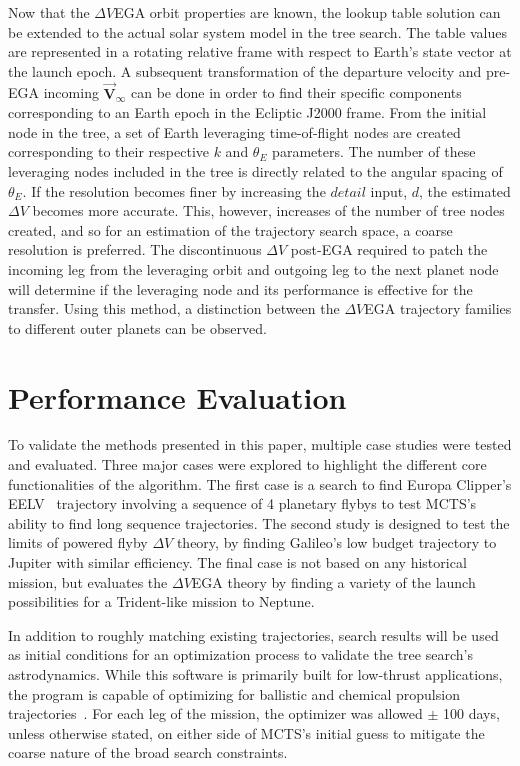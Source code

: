 \documentclass[letterpaper, preprint, paper,11pt]{AAS}	%
\begin{document}
Now that the $\Delta V$EGA orbit properties are known, the lookup table solution can be extended to the actual solar system model in the tree search. The table values are represented in a rotating relative frame with respect to Earth's state vector at the launch epoch. A subsequent transformation of the departure velocity and pre-EGA incoming $\vec{\textbf{V}}_{\infty}$ can be done in order to find their specific components corresponding to an Earth epoch in the Ecliptic J2000 frame. From the initial node in the tree, a set of Earth leveraging time-of-flight nodes are created corresponding to their respective $k$ and $\theta_E$ parameters. The number of these leveraging nodes included in the tree is directly related to the angular spacing of $\theta_E$. If the resolution becomes finer by increasing the $\textit{detail}$ input, $d$, the estimated $\Delta V$ becomes more accurate. This, however, increases of the number of tree nodes created, and so for an estimation of the trajectory search space, a coarse resolution is preferred. The discontinuous $\Delta V$ post-EGA required to patch the incoming leg from the leveraging orbit and outgoing leg to the next planet node will determine if the leveraging node and its performance is effective for the transfer. Using this method, a distinction between the $\Delta V$EGA trajectory families to different outer planets can be observed.

\section*{Performance Evaluation}

To validate the methods presented in this paper, multiple case studies were tested and evaluated. Three major cases were explored to highlight the different core functionalities of the algorithm. The first case is a search to find Europa Clipper's EELV~\cite{Buffington2014} trajectory involving a sequence of 4 planetary flybys to test MCTS's ability to find long sequence trajectories. The second study is designed to test the limits of powered flyby $\Delta V$ theory, by finding Galileo's low budget trajectory to Jupiter with similar efficiency. The final case is not based on any historical mission, but evaluates the $\Delta V$EGA theory by finding a variety of the launch possibilities for a Trident-like mission to Neptune.

In addition to roughly matching existing trajectories, search results will be used as initial conditions for an optimization process to validate the tree search's astrodynamics. While this software is primarily built for low-thrust applications, the program is capable of optimizing for ballistic and chemical propulsion trajectories~\cite{Sims2006}. For each leg of the mission, the optimizer was allowed $\pm$ 100 days, unless otherwise stated, on either side of MCTS's initial guess to mitigate the coarse nature of the broad search constraints.
\end{document}
